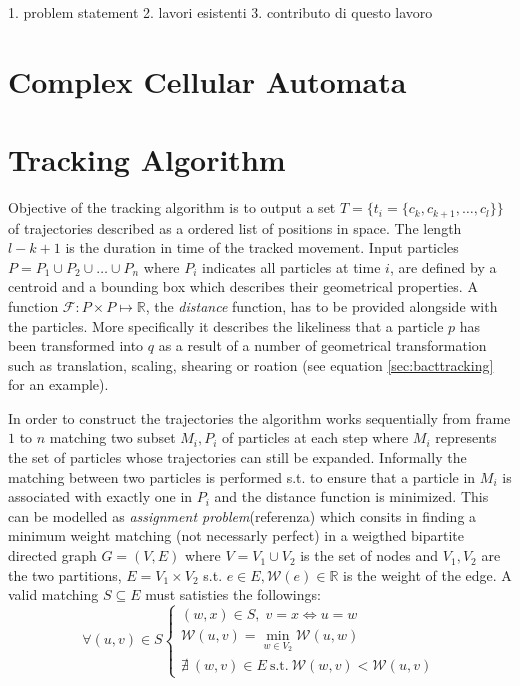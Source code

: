\documentclass[conference]{IEEEtran}
\begin{document}
1. problem statement
2. lavori esistenti
3. contributo di questo lavoro




\section{Complex Cellular Automata}


\section{Tracking Algorithm}
Objective of the tracking algorithm is to output a set $T=\{t_i=\{c_k,c_{k+1},\ldots,c_l\}\}$ of trajectories  described as a ordered list of positions in space. The length $l-k+1$ is the duration in time of the tracked movement. 
Input particles $P=P_1 \cup P_2 \cup \ldots \cup P_n$ where $P_i$ indicates all particles at time $i$, are defined by a centroid and a bounding box which describes their geometrical properties. A function $\mathcal{F} :  P \times P \mapsto \mathbb{R}$, the \textit{distance} function, has to be provided alongside with the particles. More specifically it describes the likeliness that a particle $p$ has been transformed into $q$ as a result of a number of geometrical transformation such as translation, scaling, shearing or roation (see equation \ref{sec:bacttracking} for an example). 

 
In order to construct the trajectories the algorithm works sequentially from frame $1$ to $n$ matching two subset $M_i,P_{i}$ of particles at each step where $M_i$ represents the set of particles whose trajectories can still be expanded. Informally the matching between two particles is performed s.t. to ensure that a particle in $M_i$ is associated with exactly one in $P_i$ and the distance function is minimized.
This can be modelled as \textit{assignment problem}(referenza) which consits in finding a minimum weight matching (not necessarly perfect) in  a weigthed bipartite directed graph $G=(V,E)$ where $V=V_1 \cup V_2$ is the set of nodes and $V_1,V_2$ are the two partitions, $E = V_1 \times V_2$ s.t. $e \in E, \mathcal{W}(e) \in \mathbb{R}$ is the weight of the edge. 
A valid matching $S \subseteq E$ must satisties the followings: 
\[ \forall (u,v) \in S 
\left\{
  \begin{array}{lr}
   (w,x) \in S,\; v=x\Longleftrightarrow u=w\\
   \mathcal{W}(u,v) = \min_{w \in V_2} \mathcal{W}(u,w)  \\
    \nexists \: (w,v) \in E \: \mbox{s.t.} \: \mathcal{W}(w,v) < \mathcal{W}(u,v)
  \end{array}
\right.
\]
\end{document}
